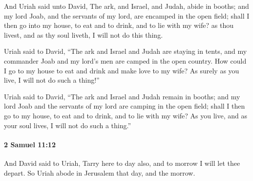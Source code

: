 			\begin{versebox}
					\item[BHS] 
					\item[ASV] And Uriah said unto David, The ark, and Israel, and Judah, abide in booths; and my lord Joab, and the servants of my lord, are encamped in the open field; shall I then go into my house, to eat and to drink, and to lie with my wife? as thou livest, and as thy soul liveth, I will not do this thing.
					\item[NIV] Uriah said to David, “The ark and Israel and Judah are staying in tents, and my commander Joab and my lord’s men are camped in the open country. How could I go to my house to eat and drink and make love to my wife? As surely as you live, I will not do such a thing!”
					\item[NRSV] Uriah said to David, “The ark and Israel and Judah remain in booths; and my lord Joab and the servants of my lord are camping in the open field; shall I then go to my house, to eat and to drink, and to lie with my wife? As you live, and as your soul lives, I will not do such a thing.”
			\end{versebox}

		\paragraph{2 Samuel 11:12} %
			\label{2SAMUEL-11-12}

			And David said to Uriah, Tarry here to day also, and to morrow I will let thee depart. So Uriah abode in Jerusalem that day, and the morrow.

